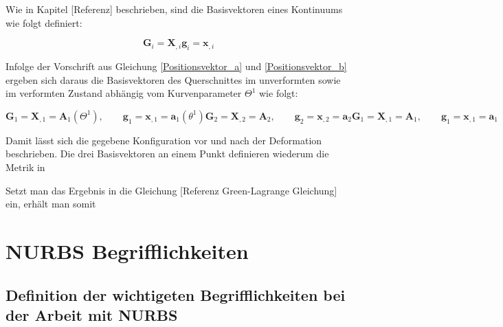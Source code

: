 \documentclass[german,a4paper,12pt,oneside]{scrbook}
\theoremstyle{definition}
\theoremstyle{definition}
\theoremstyle{definition}
\theoremstyle{definition}
\theoremstyle{definition}
\theoremstyle{definition}
\begin{document}
Wie in Kapitel [Referenz] beschrieben, sind die Basisvektoren eines Kontinuums wie folgt definiert:

\begin{subequations}
    \begin{equation}
        \bm{G}_i = \bm{X}_{,i}
    \end{equation}
    \begin{equation}
        \bm{g}_i = \bm{x}_{,i}
    \end{equation}
\end{subequations}

Infolge der Vorschrift aus Gleichung \eqref{Positionsvektor_a} und \eqref{Positionsvektor_b} ergeben sich daraus die Basisvektoren des Querschnittes im unverformten sowie im verformten Zustand abhängig vom Kurvenparameter $\Theta^1$ wie folgt: 

\begin{subequations}
    \begin{equation}
        \bm{G}_1 = \bm{X}_{,1} = \bm{A}_1(\Theta^1), \qquad     
        \bm{g}_1 = \bm{x}_{,1} = \bm{a}_1(\theta^1)
    \end{equation}
    \begin{equation}
        \bm{G}_2 = \bm{X}_{,2} = \bm{A}_2, \qquad     
        \bm{g}_2 = \bm{x}_{,2} = \bm{a}_2
    \end{equation}
    \begin{equation}
        \bm{G}_1 = \bm{X}_{,1} = \bm{A}_1, \qquad     
        \bm{g}_1 = \bm{x}_{,1} = \bm{a}_1
    \end{equation}
\end{subequations}

\vspace{1.0cm}
Damit lässt sich die gegebene Konfiguration vor und nach der Deformation beschrieben. Die drei Basisvektoren an einem Punkt definieren wiederum die Metrik in

Setzt man das Ergebnis in die Gleichung [Referenz Green-Lagrange Gleichung] ein, erhält man somit 





\chapter{NURBS Begrifflichkeiten}  \setcounter{page}{1}   %

\section{Definition der wichtigeten Begrifflichkeiten bei der Arbeit mit NURBS}
\end{document}
